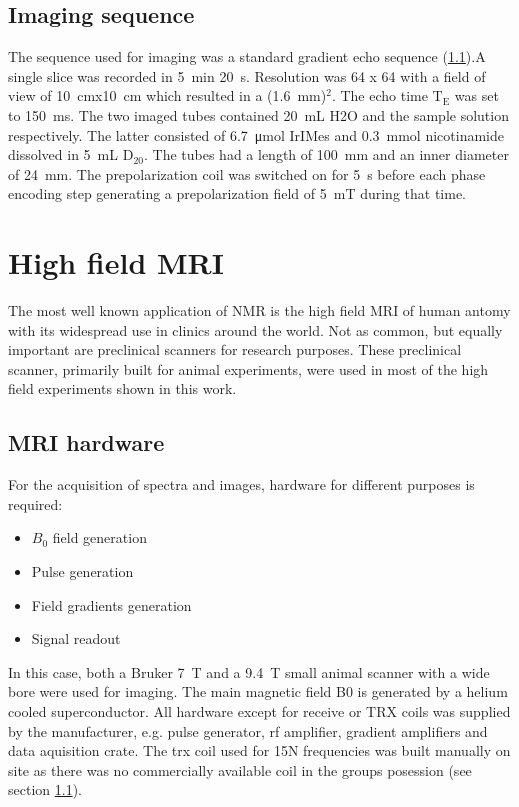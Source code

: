         \subsection{Imaging sequence}
        The sequence used for imaging was a standard gradient echo sequence (\ref{}).A single slice was recorded in \SI{5}{\minute} \SI{20}{\second}. Resolution was 64 x 64 with a field of view of \SI{10}{\cm}x\SI{10}{\cm} which resulted in a (\SI{1.6}{\mm})$^2$. The echo time $\mathrm{T_E}$ was set to \SI{150}{\milli\second}. The two imaged tubes contained \SI{20}{\milli\liter} H2O and the sample solution respectively. The latter consisted of \SI{6.7}{\micro\mole} IrIMes and \SI{0.3}{\milli\mole} nicotinamide dissolved in \SI{5}{\milli\liter} $\mathrm{D_20}$. The tubes had a length of \SI{100}{\milli\meter} and an inner diameter of \SI{24}{\milli\meter}. The prepolarization coil was switched on for \SI{5}{\second} before each phase encoding step generating a prepolarization field of \SI{5}{\milli\tesla} during that time. 
    \section{High field MRI}
        The most well known application of NMR is the high field MRI of human antomy with its widespread use in clinics around the world. Not as common, but equally important are preclinical scanners for research purposes. These preclinical scanner, primarily built for animal experiments, were used in most of the high field experiments shown in this work.  \subsection{MRI hardware}
            For the acquisition of spectra and images, hardware for different purposes is required:
            \begin{itemize}
            \item $B_0$ field generation
            \item Pulse generation
            \item Field gradients generation
            \item Signal readout
            \end{itemize}
            In this case, both a Bruker \SI{7}{\tesla} and a \SI{9.4}{\tesla} small animal scanner with a wide bore were used for imaging. The main magnetic field B0 is generated by a helium cooled superconductor. All hardware except for receive or TRX coils was supplied by the manufacturer, e.g. pulse generator, rf amplifier, gradient amplifiers and data aquisition crate. The trx coil used for 15N frequencies was built manually on site as there was no commercially available coil in the groups posession (see section \ref{}).

